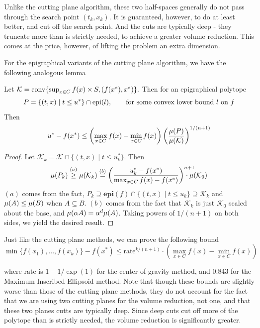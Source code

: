 Unlike the cutting plane algorithm, these two half-spaces generally do not
pass through the search point $(t_k, x_k)$. It is guaranteed, however, to do
at least better, and cut off the search point. And the cuts are typically deep - they truncate more than is strictly needed, to achieve a greater volume reduction. This comes at the price, however, of lifting the problem an extra dimension.

For the epigraphical variants of the cutting plane algorithm, we have the following analogous lemma

\begin{lem} \label{lem:non_strongly_convex_convergencegen}
Let  $\mathcal{K}=\mbox{{\rm conv}}\{\sup_{x\in C} f(x) \times  S,(f(x^*),x^*)\}.$
Then for an epigraphical polytope $$P =\{(t,x)\mid t\leq u^*\}\cap \mbox{\normalfont epi}(l), \qquad \mbox{for some convex lower bound $l$ on $f$}
$$
Then \[
u^*-f(x^*)\leq \left(\max_{x\in C}f(x)-\min_{x\in C}f(x) \right) \left( \frac{\mu(P)}{\mu(\mathcal{K})} \right)^{1/(n+1)}
\]
\end{lem}
\begin{proof}
Let $\mathcal{K}_k =\mathcal{K}\cap\{(t,x)\mid t \leq u^*_k\}$. Then 
\[
  \volmu(P_k)\overset{(a)}{\geq}\volmu(\mathcal{K}_k)\overset{(b)}{=}
  \left(\frac{u^*_k-f(x^*)}{\max_{x\in C} f(x) -f(x^*)}\right)^{n+1} \!\!\!\!\!\!\!\!\!\cdot \volmu(\mathcal{K}_0)
\]
$(a)$ comes from the fact, $P_k\supseteq \mathbf{epi}(f) \cap \{(t,x) \mid t \leq u_k\} \supseteq \mathcal{K}_k$ and
$\mu(A)\leq\mu(B)$ when $A\subseteq B$. $(b)$ comes from the fact
that $\mathcal{K}_k$ is just $\mathcal{K}_0$ scaled about the
base, and $\mu(\alpha A)=\alpha^{d}\mu(A)$.
Taking powers of $1/(n+1)$ on both sides, we yield the desired result.
\end{proof}

Just like the cutting plane methods, we can prove the following bound
$$
\min\{f(x_{1}),\dots,f(x_{k})\}-f(x^{*})\leq \mbox{rate}^{k/(n+1)}\cdot\left(\max_{x\in C}f(x)-\min_{x\in C}f(x)\right)
$$

where $\mbox{rate}$ is $1 - 1/\exp(1)$ for the center of gravity method, and
$0.843$ for the Maximum Inscribed Ellipsoid method. Note that though these
bounds are slightly worse than those of the cutting plane methods, they
do not account for the fact that we are using two cutting planes for the 
volume reduction, not one, and that these two planes cutts are typically deep.
Since deep cuts cut off more of the polytope than is strictly needed, the 
volume reduction is significantly greater.

